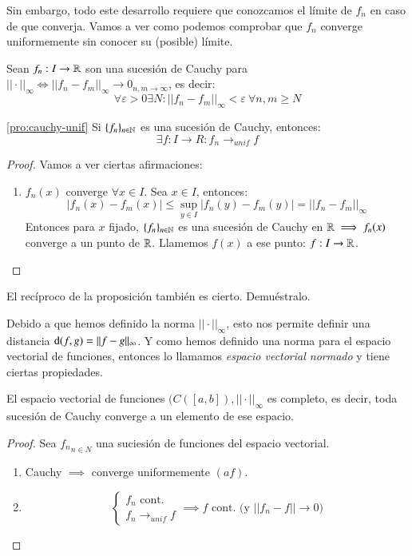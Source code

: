 Sin embargo, todo este desarrollo requiere que conozcamos el límite de $f_n$ en caso de que converja. Vamos a ver como podemos comprobar que $f_n$ converge uniformemente sin conocer su (posible) límite.
\begin{dfn}
    Sean $f_n : I \to \mathbb{R}$ son una sucesión de Cauchy para $||\cdot||_\infty \iff ||f_n - f_m||_\infty \to 0_{n,m \to \infty}$, es decir:
    $$
        \forall \varepsilon > 0 \exists N : ||f_n - f_m||_\infty < \varepsilon\ \forall n,m \geq N
    $$
\end{dfn}
\begin{pro}\ref{pro:cauchy-unif}
    Si $\{f_n\}_{n\in\mathbb{N}}$ es una sucesión de Cauchy, entonces:
    $$
        \exists f : I \to R : f_n \to_{unif} f
    $$
\end{pro}
\begin{proof}
    Vamos a ver ciertas afirmaciones:
    \begin{enumerate}
        \item $f_n(x)$ converge $\forall x \in I$. Sea $x\in I$, entonces:
        $$
            |f_n(x) - f_m(x) | \leq \sup_{y\in I} |f_n(y) - f_m(y)| = ||f_n - f_m||_\infty
        $$
        Entonces para $x$ fijado, $\{f_n\}_{n\in\mathbb{N}}$ es una sucesión de Cauchy en $\mathbb{R} \implies f_n(x)$ converge a un punto de $\mathbb{R}$. Llamemos $f(x)$ a ese punto: $f : I \to \mathbb{R}$.
    \end{enumerate}
\end{proof}
\begin{th_ex}
    El recíproco de la proposición \label{pro:cauchy-unif} también es cierto. Demuéstralo.
\end{th_ex}
Debido a que hemos definido la norma $||\cdot||_\infty$, esto nos permite definir una distancia $\mathrm{d}(f, g) = || f -g || _\infty$. Y como hemos definido una norma para el espacio vectorial de funciones, entonces lo llamamos \textit{espacio vectorial normado} y tiene ciertas propiedades.
\begin{pro}
    El espacio vectorial de funciones $(C([a, b]), ||\cdot||_\infty$ es completo, es decir, toda sucesión de Cauchy converge a un elemento de ese espacio.
\end{pro}
\begin{proof}
    Sea ${f_n}_{n\in N}$ una suciesión de funciones del espacio vectorial.
    \begin{enumerate}
        \item Cauchy $\implies$ converge uniformemente $( a f)$.
        \item
            $$
                \begin{cases}
                    f_n \text{ cont.}\\
                    f_n \to_{unif} f
                \end{cases} \implies f \text{ cont. (y $||f_n - f|| \to 0$)}
            $$
    \end{enumerate}
\end{proof}
